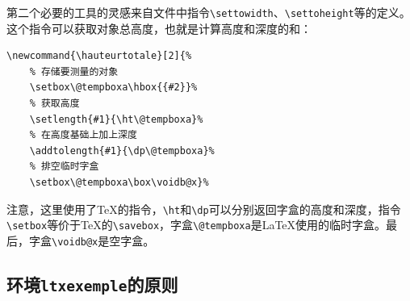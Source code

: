 第二个必要的工具的灵感来自文件中指令\verb|\settowidth|、\verb|\settoheight|等的定义。这个指令可以获取对象总高度，也就是计算高度和深度的和：

\begin{dmd}
\begin{verbatim}
\newcommand{\hauteurtotale}[2]{% 
    % 存储要测量的对象
    \setbox\@tempboxa\hbox{{#2}}%
    % 获取高度
    \setlength{#1}{\ht\@tempboxa}% 
    % 在高度基础上加上深度
    \addtolength{#1}{\dp\@tempboxa}%
    % 排空临时字盒
    \setbox\@tempboxa\box\voidb@x}%
\end{verbatim}
\end{dmd}

注意，这里使用了\TeX 的指令，\verb|\ht|和\verb|\dp|可以分别返回字盒的高度和深度，指令\verb|\setbox|等价于\TeX 的\verb|\savebox|，字盒\verb|\@tempboxa|是\LaTeX 使用的临时字盒。最后，字盒\verb|\voidb@x|是空字盒。

\subsection{环境\texttt{ltxexemple}的原则}

